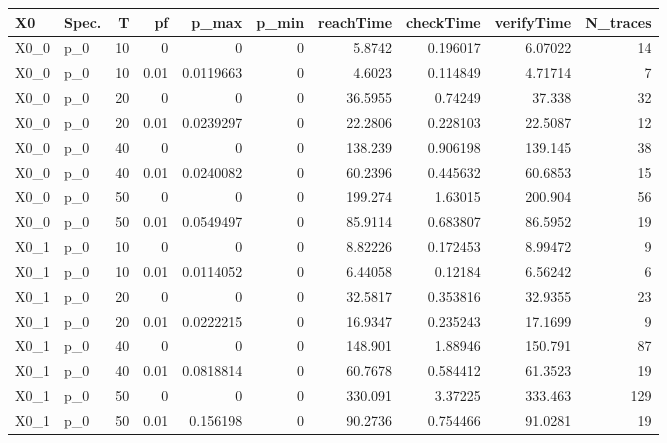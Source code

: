 \begin{tabular}{llrrrrrrrr}
\hline
 X0   & Spec.   &   T &   pf &      p\_max &    p\_min &   reachTime &   checkTime &   verifyTime &   N\_traces \\
\hline
 X0\_0 & p\_0     &  10 & 0    & 0          & 0        &     5.8742  &   0.196017  &      6.07022 &         14 \\
 X0\_0 & p\_0     &  10 & 0.01 & 0.0119663  & 0        &     4.6023  &   0.114849  &      4.71714 &          7 \\
 X0\_0 & p\_0     &  20 & 0    & 0          & 0        &    36.5955  &   0.74249   &     37.338   &         32 \\
 X0\_0 & p\_0     &  20 & 0.01 & 0.0239297  & 0        &    22.2806  &   0.228103  &     22.5087  &         12 \\
 X0\_0 & p\_0     &  40 & 0    & 0          & 0        &   138.239   &   0.906198  &    139.145   &         38 \\
 X0\_0 & p\_0     &  40 & 0.01 & 0.0240082  & 0        &    60.2396  &   0.445632  &     60.6853  &         15 \\
 X0\_0 & p\_0     &  50 & 0    & 0          & 0        &   199.274   &   1.63015   &    200.904   &         56 \\
 X0\_0 & p\_0     &  50 & 0.01 & 0.0549497  & 0        &    85.9114  &   0.683807  &     86.5952  &         19 \\
 X0\_1 & p\_0     &  10 & 0    & 0          & 0        &     8.82226 &   0.172453  &      8.99472 &          9 \\
 X0\_1 & p\_0     &  10 & 0.01 & 0.0114052  & 0        &     6.44058 &   0.12184   &      6.56242 &          6 \\
 X0\_1 & p\_0     &  20 & 0    & 0          & 0        &    32.5817  &   0.353816  &     32.9355  &         23 \\
 X0\_1 & p\_0     &  20 & 0.01 & 0.0222215  & 0        &    16.9347  &   0.235243  &     17.1699  &          9 \\
 X0\_1 & p\_0     &  40 & 0    & 0          & 0        &   148.901   &   1.88946   &    150.791   &         87 \\
 X0\_1 & p\_0     &  40 & 0.01 & 0.0818814  & 0        &    60.7678  &   0.584412  &     61.3523  &         19 \\
 X0\_1 & p\_0     &  50 & 0    & 0          & 0        &   330.091   &   3.37225   &    333.463   &        129 \\
 X0\_1 & p\_0     &  50 & 0.01 & 0.156198   & 0        &    90.2736  &   0.754466  &     91.0281  &         19 \\

\end{tabular}
